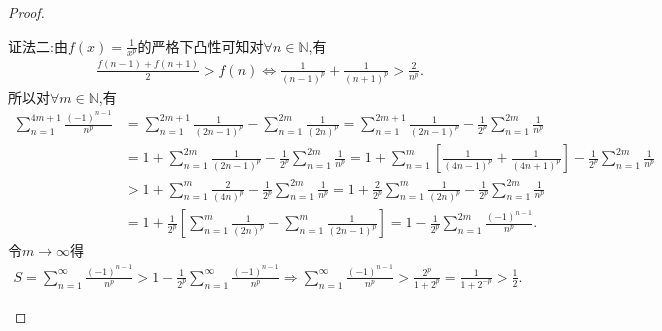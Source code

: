 \documentclass[../../main.tex]{subfiles}%
\begin{document}
\begin{proof}
\begin{enumerate}[(1)]
{\color{blue}证法二:}由$f(x)=\frac{1}{x^p}$的严格下凸性可知对$\forall n\in \mathbb{N}$,有
\begin{align*}
\frac{f(n-1)+f(n+1)}{2} > f(n)\Longleftrightarrow \frac{1}{\left( n-1 \right) ^p}+\frac{1}{\left( n+1 \right) ^p}>\frac{2}{n^p}.
\end{align*}
所以对$\forall m\in \mathbb{N}$,有
\begin{align*}
\sum_{n=1}^{4m+1}{\frac{\left( -1 \right) ^{n-1}}{n^p}}&=\sum_{n=1}^{2m+1}{\frac{1}{\left( 2n-1 \right) ^p}}-\sum_{n=1}^{2m}{\frac{1}{\left( 2n \right) ^p}}=\sum_{n=1}^{2m+1}{\frac{1}{\left( 2n-1 \right) ^p}}-\frac{1}{2^p}\sum_{n=1}^{2m}{\frac{1}{n^p}}\\
&=1+\sum_{n=1}^{2m}{\frac{1}{\left( 2n-1 \right) ^p}}-\frac{1}{2^p}\sum_{n=1}^{2m}{\frac{1}{n^p}}=1+\sum_{n=1}^m{\left[ \frac{1}{\left( 4n-1 \right) ^p}+\frac{1}{\left( 4n+1 \right) ^p} \right]}-\frac{1}{2^p}\sum_{n=1}^{2m}{\frac{1}{n^p}}\\
&>1+\sum_{n=1}^m{\frac{2}{\left( 4n \right) ^p}}-\frac{1}{2^p}\sum_{n=1}^{2m}{\frac{1}{n^p}}=1+\frac{2}{2^p}\sum_{n=1}^m{\frac{1}{\left( 2n \right) ^p}}-\frac{1}{2^p}\sum_{n=1}^{2m}{\frac{1}{n^p}}\\
&=1+\frac{1}{2^p}\left[ \sum_{n=1}^m{\frac{1}{\left( 2n \right) ^p}}-\sum_{n=1}^m{\frac{1}{\left( 2n-1 \right) ^p}} \right] =1-\frac{1}{2^p}\sum_{n=1}^{2m}{\frac{\left( -1 \right) ^{n-1}}{n^p}}.
\end{align*}
令$m\to \infty$得
\begin{align*}
S=\sum_{n=1}^{\infty}{\frac{\left( -1 \right) ^{n-1}}{n^p}}>1-\frac{1}{2^p}\sum_{n=1}^{\infty}{\frac{\left( -1 \right) ^{n-1}}{n^p}}\Longrightarrow \sum_{n=1}^{\infty}{\frac{\left( -1 \right) ^{n-1}}{n^p}}>\frac{2^p}{1+2^p}=\frac{1}{1+2^{-p}}>\frac{1}{2}.
\end{align*}
\end{enumerate}
\end{proof}
\end{document}
